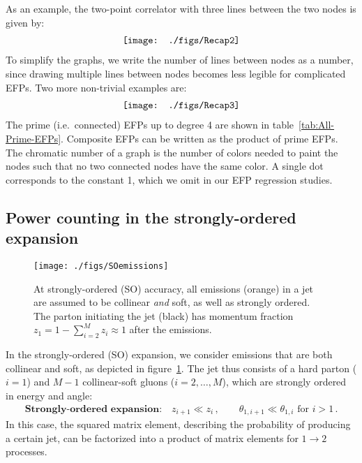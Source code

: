 \documentclass[a4paper,11pt]{article}
\newcommand{\fig}[1]{figure~\ref{fig:#1}}
\newcommand{\tab}[1]{table~\ref{tab:#1}}
\begin{document}
As an example, the two-point correlator with three lines between the two nodes is given by:
\begin{align}
 \texttt{[image: ./figs/Recap2]}  \raisetag{2.0\baselineskip} 
 \label{eq:full-dumbell}
\end{align}
To simplify the graphs, we write the number of lines between nodes as a number, since drawing multiple lines between nodes becomes less legible for complicated EFPs.
%
Two more non-trivial examples are: 
\begin{align}
 \texttt{[image: ./figs/Recap3]}  \raisetag{1.9\baselineskip}  
\end{align}
The prime (i.e.~connected) EFPs up to degree 4 are shown in \tab{All-Prime-EFPs}.
%
Composite EFPs can be written as the product of prime EFPs.
%
The chromatic number of a graph is the number of colors needed to paint the nodes such that no two connected nodes have the same color.
%
A single dot corresponds to the constant 1, which we omit in our EFP regression studies.

  
\subsection{Power counting in the strongly-ordered expansion}

\begin{figure}[t]\centering
 \texttt{[image: ./figs/SOemissions]} \hfill 
 \caption{At strongly-ordered (SO) accuracy, all emissions (orange) in a jet are assumed to be collinear \emph{and} soft, as well as strongly ordered.
 The parton initiating the jet (black) has momentum fraction $z_1 = 1 - \sum_{i=2}^M z_i \approx 1$ after the emissions. \label{fig:so}}
 \end{figure}

In the strongly-ordered (SO) expansion, we consider emissions that are both collinear and soft, as depicted in \fig{so}.
%
The jet thus consists of a hard parton ($i=1$) and $M\!-\!1$ collinear-soft gluons ($i=2,\dots, M$), which are strongly ordered in energy and angle:
\begin{align}\label{eq:strongordering}
\textbf{Strongly-ordered expansion:} \quad z_{i+1} \ll z_i\,, \qquad \theta_{1,i+1} \ll \theta_{1,i} \text{ for } i>1\,.
\end{align}
In this case, the squared matrix element, describing the probability of producing a certain jet, can be factorized into a product of matrix elements for $1 \to 2$ processes.
\end{document}

